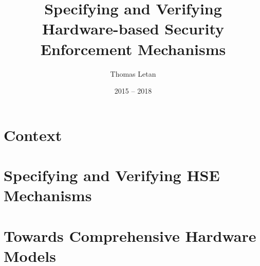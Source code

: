 \documentclass[oneside,a4paper]{memoir}
\title{Specifying and Verifying Hardware-based Security Enforcement Mechanisms}
\author{Thomas Letan}
\date{2015 -- 2018}
\theoremstyle{break}
\begin{document}
  \frontmatter

  \maketitle

  \cleardoublepage

  \begin{abstract}
    
  \end{abstract}

  \cleardoublepage

  \tableofcontents

  \cleardoublepage

  \listoffigures
  \listoftables
  

  \mainmatter

  

  \part{Context}
  
  

  \part{Specifying and Verifying HSE Mechanisms}
  

  \part{Towards Comprehensive Hardware Models}
  

  

  \appendix

  
  

  \printacronyms[include-classes={abbrev},heading={chapter},name=Acronyms]
  \printindex
  
  
\end{document}
